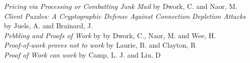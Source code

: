 {\em Pricing via Processing or Combatting Junk Mail} by Dwork, C. and Naor, M. \\
{\em Client Puzzles: A Cryptographic Defense Against Connection Depletion Attacks} by Juels, A. and Brainard, J. \\
{\em Pebbling and Proofs of Work} by   by Dwork, C., Naor, M. and Wee, H.\\
{\em Proof-of-work proves not to work} by Laurie, B. and Clayton, R \\
{\em Proof of Work can work} by Camp, L. J. and Liu, D\\
